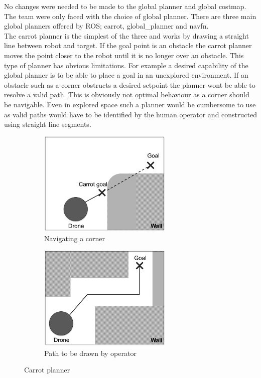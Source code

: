 \documentclass[capstone_report.tex]{subfiles}
\begin{document}
No changes were needed to be made to the global planner and global costmap.  The team were only faced with the choice of global planner.  There are three main global planners offered by ROS; carrot, global\_planner and navfn.\\

The carrot planner is the simplest of the three and works by drawing a straight line between robot and target.  If the goal point is an obstacle the carrot planner moves the point closer to the robot until it is no longer over an obstacle.  This type of planner has obvious limitations.  For example a desired capability of the global planner is to be able to place a goal in an unexplored environment.  If an obstacle such as a corner obstructs a desired setpoint the planner wont be able to resolve a valid path.  This is obviously not optimal behaviour as a corner should be navigable.  Even in explored space such a planner would be cumbersome to use as valid paths would have to be identified by the human operator and constructed using straight line segments.

\begin{figure}[H]
    \centering
    \begin{subfigure}{.5\textwidth}
        \centering
        \includegraphics[width=0.7\textwidth]{imgs/carrot_planner_a.png}
        \caption{Navigating a corner}
    \end{subfigure}%
    \begin{subfigure}{.5\textwidth}
        \centering
        \includegraphics[width=0.7\textwidth]{imgs/carrot_planner_b.png}
        \caption{Path to be drawn by operator}
    \end{subfigure}
    \caption{Carrot planner\label{fig:carrot}}
\end{figure}
\end{document}
